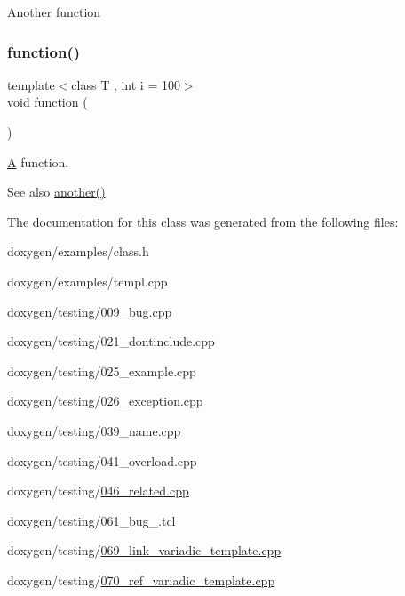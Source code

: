 Another function \mbox{\label{class_test_a51a683fa4fcec142ab1574e00a7b6860}} 
\subsubsection{\texorpdfstring{function()}{function()}}
{\footnotesize\ttfamily template$<$class T , int i = 100$>$ \\
void function (\begin{DoxyParamCaption}{ }\end{DoxyParamCaption})\hspace{0.3cm}{\ttfamily [related]}}

\mbox{\hyperlink{class_a}{A}} function.

\begin{DoxySeeAlso}{See also}
\mbox{\hyperlink{class_test_a1283d836e0611ff772c1b06a31ecbbfe}{another()}} 
\end{DoxySeeAlso}


The documentation for this class was generated from the following files\+:\begin{DoxyCompactItemize}
\item 
doxygen/examples/class.\+h\item 
doxygen/examples/templ.\+cpp\item 
doxygen/testing/009\+\_\+bug.\+cpp\item 
doxygen/testing/021\+\_\+dontinclude.\+cpp\item 
doxygen/testing/025\+\_\+example.\+cpp\item 
doxygen/testing/026\+\_\+exception.\+cpp\item 
doxygen/testing/039\+\_\+name.\+cpp\item 
doxygen/testing/041\+\_\+overload.\+cpp\item 
doxygen/testing/\mbox{\hyperlink{046__related_8cpp}{046\+\_\+related.\+cpp}}\item 
doxygen/testing/061\+\_\+bug\+\_.\+tcl\item 
doxygen/testing/\mbox{\hyperlink{069__link__variadic__template_8cpp}{069\+\_\+link\+\_\+variadic\+\_\+template.\+cpp}}\item 
doxygen/testing/\mbox{\hyperlink{070__ref__variadic__template_8cpp}{070\+\_\+ref\+\_\+variadic\+\_\+template.\+cpp}}\end{DoxyCompactItemize}
